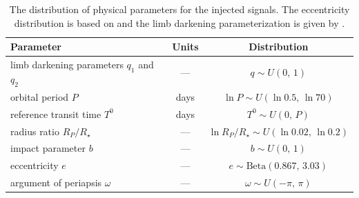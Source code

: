 \documentclass[12pt,preprint]{aastex}
\newcommand{\tablabel}[1]{\label{tab:#1}}
\newcommand{\period}{{\ensuremath{P}}}
\newcommand{\phase}{{\ensuremath{T^0}}}
\newcommand{\impact}{{\ensuremath{b}}}
\newcommand{\ecc}{{\ensuremath{e}}}
\newcommand{\pomega}{{\ensuremath{\omega}}}
\begin{document}
\clearpage

\begin{table}[p]
\begin{center}
\begin{tabular}{lcc}
\toprule
Parameter & Units & Distribution \\
\midrule

limb darkening parameters $q_1$ and $q_2$ & --- & $q \sim U(0,\,1)$ \\
orbital period \period & days & $\ln \period \sim U(\ln 0.5,\,\ln 70)$ \\
reference transit time \phase & days & $\phase \sim U(0,\,\period)$ \\
radius ratio $R_P/R_\star$ & --- & $\ln R_P/R_\star \sim U(\ln 0.02,\,\ln 0.2)$ \\
impact parameter \impact & --- & $\impact \sim U(0,\,1)$ \\
eccentricity \ecc & --- & $\ecc \sim \mathrm{Beta}(0.867,\,3.03)$ \\
argument of periapsis \pomega & --- & $\pomega \sim U(-\pi,\,\pi)$ \\

\bottomrule
\end{tabular}
\end{center}
\caption{%
The distribution of physical parameters for the injected signals.
The eccentricity distribution is based on \citet{kipping-ecc} and the
limb darkening parameterization is given by \citet{kipping-ld}.
\tablabel{dist}}
\end{table}

\begin{table}[p]
\begin{center}
\small

\end{center}
\caption{%
The catalog of planet candidates and their observable properties.
These values and their uncertainties are derived from MCMC samplings and the
numbers are computed as the 0.16, 0.5, and 0.84 posterior sample quantiles.
\tablabel{cand}}
\end{table}
\end{document}
